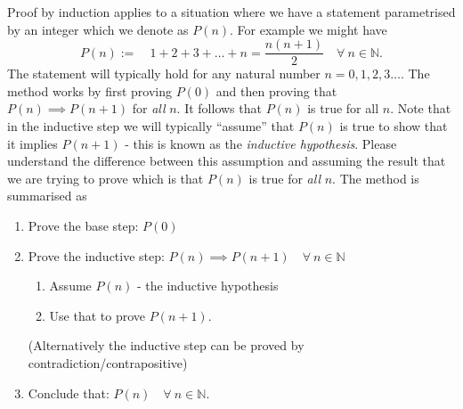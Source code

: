 Proof by induction applies to a situation where we have a statement
parametrised by an integer which we denote as $P(n)$. For example we might
have
\begin{equation} \label{eq:ex1}
 P(n):=\quad 1+2+3+\dots+n=\frac{n(n+1)}{2}\quad\forall ~n\in\mathbb{N}.
\end{equation}
The statement will typically hold for any natural number $n=0,1,2,3\dots$. The
method works by first proving $P(0)$ and then proving that $P(n)\implies
P(n+1)$ for \emph{all} $n$. It follows that $P(n)$ is true for all $n$. Note
that in the inductive step we will typically ``assume'' that $P(n)$ is true to
show that it implies $P(n+1)$ - this is known as the \emph{inductive
hypothesis}. Please understand the difference between this assumption and
assuming the result that we are trying to prove which is that $P(n)$ is true
for \emph{all} $n$. The method is summarised as
\begin{enumerate}
  \item Prove the base step: $P(0)$
  \item Prove the inductive step: $P(n) \implies P(n+1) \quad\forall ~n\in \mathbb{N}$
    \begin{enumerate}
      \item Assume $P(n)$ - the inductive hypothesis
      \item Use that to prove $P(n+1)$.
    \end{enumerate}
    (Alternatively the inductive step can be proved by
    contradiction/contrapositive)
  \item Conclude that: $P(n) \quad\forall ~n \in \mathbb{N}$.
\end{enumerate}

\clearpage
